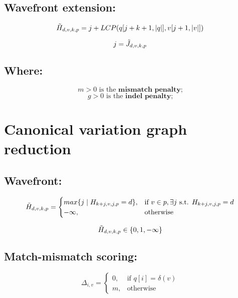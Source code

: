 \documentclass{article}
\begin{document}
\subsection{Wavefront extension:}
    \begin{equation}
    \Tilde{H}_{d,v,k,p} = j + LCP(q[j + k + 1, \lvert q \rvert], v[j + 1, \lvert v \rvert])
\end{equation}

$$j = \Tilde{J}_{d,v,k,p}$$

\subsection{Where:}
$$m > 0 \text{ is the } \textbf{mismatch penalty;}$$
$$g > 0 \text{ is the } \textbf{indel penalty;}$$

\section{Canonical variation graph reduction}
    
    \subsection{Wavefront:}
    \begin{equation}
        \Tilde{H}_{d,v,k,p} = \begin{cases}
            max\{j \mid H_{k+j,v,j,p} = d\}, & \text{if } v \in p, \exists j \text{ s.t. } H_{k+j,v,j,p} = d \\
            -\infty, & \text{otherwise}
        \end{cases}
    \end{equation}

    $$\Tilde{H}_{d,v,k,p} \in \{0, 1, -\infty\}$$
    
    \subsection{Match-mismatch scoring:}
    \begin{equation}
        \Delta_{i,v} = \begin{cases}
            0, & \text{if $q[i] = \delta(v)$} \\
            m, & \text{otherwise}
        \end{cases}
    \end{equation}
    
\end{document}
